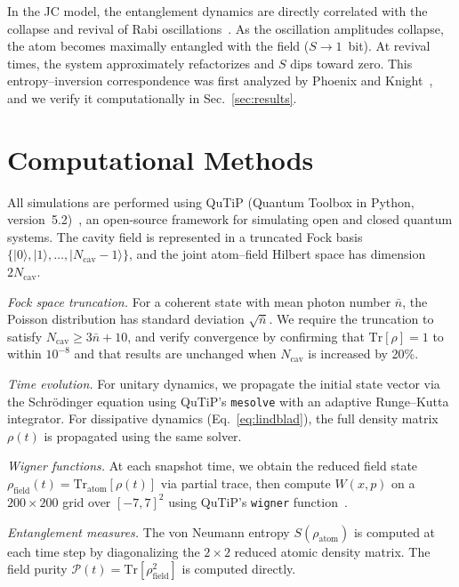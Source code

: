 \documentclass[%
 reprint,
 amsmath,amssymb,
 aps,
]{revtex4-2}
\begin{document}
In the JC model, the entanglement dynamics are directly correlated with the collapse and revival of Rabi oscillations~\cite{phoenix1988}. As the oscillation amplitudes collapse, the atom becomes maximally entangled with the field ($S \to 1$~bit). At revival times, the system approximately refactorizes and $S$ dips toward zero. This entropy--inversion correspondence was first analyzed by Phoenix and Knight~\cite{phoenix1988}, and we verify it computationally in Sec.~\ref{sec:results}.


\section{Computational Methods}
\label{sec:methods}

All simulations are performed using QuTiP (Quantum Toolbox in Python, version~5.2)~\cite{johansson2012, johansson2013}, an open-source framework for simulating open and closed quantum systems. The cavity field is represented in a truncated Fock basis $\{|0\rangle, |1\rangle, \ldots, |N_{\text{cav}}-1\rangle\}$, and the joint atom--field Hilbert space has dimension $2N_{\text{cav}}$.

\textit{Fock space truncation.} For a coherent state with mean photon number $\bar{n}$, the Poisson distribution has standard deviation $\sqrt{\bar{n}}$. We require the truncation to satisfy $N_{\text{cav}} \geq 3\bar{n} + 10$, and verify convergence by confirming that $\text{Tr}[\rho] = 1$ to within $10^{-8}$ and that results are unchanged when $N_{\text{cav}}$ is increased by 20\%.

\textit{Time evolution.} For unitary dynamics, we propagate the initial state vector via the Schr\"{o}dinger equation using QuTiP's \texttt{mesolve} with an adaptive Runge--Kutta integrator. For dissipative dynamics (Eq.~\ref{eq:lindblad}), the full density matrix $\rho(t)$ is propagated using the same solver.

\textit{Wigner functions.} At each snapshot time, we obtain the reduced field state $\rho_{\text{field}}(t) = \text{Tr}_{\text{atom}}[\rho(t)]$ via partial trace, then compute $W(x,p)$ on a $200 \times 200$ grid over $[-7, 7]^2$ using QuTiP's \texttt{wigner} function~\cite{johansson2012}.

\textit{Entanglement measures.} The von Neumann entropy $S(\rho_{\text{atom}})$ is computed at each time step by diagonalizing the $2 \times 2$ reduced atomic density matrix. The field purity $\mathcal{P}(t) = \text{Tr}[\rho_{\text{field}}^2]$ is computed directly.
\end{document}
